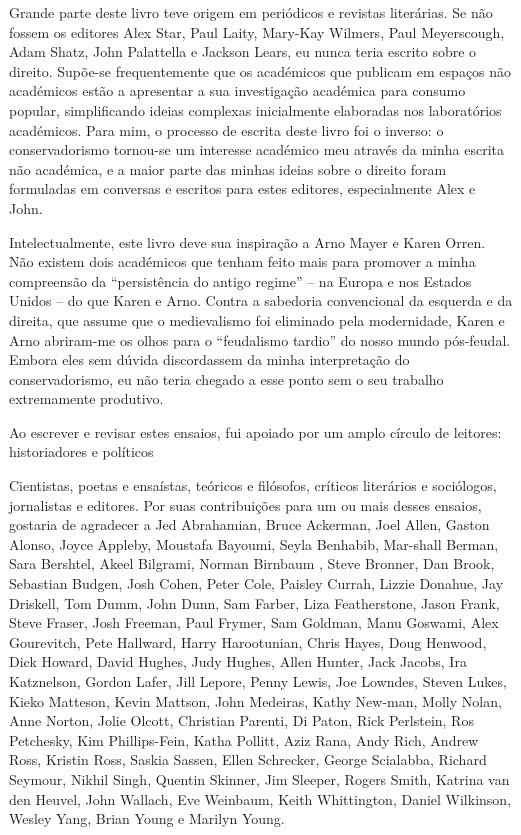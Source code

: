 Grande parte deste livro teve origem em periódicos e revistas literárias. Se não fossem os editores Alex Star, Paul Laity, Mary-Kay Wilmers, Paul Meyerscough, Adam Shatz, John Palattella e Jackson Lears, eu nunca teria escrito sobre o direito. Supõe-se frequentemente que os académicos que publicam em espaços não académicos estão a apresentar a sua investigação académica para consumo popular, simplificando ideias complexas inicialmente elaboradas nos laboratórios académicos. Para mim, o processo de escrita deste livro foi o inverso: o conservadorismo tornou-se um interesse académico meu através da minha escrita não académica, e a maior parte das minhas ideias sobre o direito foram formuladas em conversas e escritos para estes editores, especialmente Alex e John.
 \par 
Intelectualmente, este livro deve sua inspiração a Arno Mayer e Karen Orren. Não existem dois académicos que tenham feito mais para promover a minha compreensão da “persistência do antigo regime” – na Europa e nos Estados Unidos – do que Karen e Arno. Contra a sabedoria convencional da esquerda e da direita, que assume que o medievalismo foi eliminado pela modernidade, Karen e Arno abriram-me os olhos para o “feudalismo tardio” do nosso mundo pós-feudal. Embora eles sem dúvida discordassem da minha interpretação do conservadorismo, eu não teria chegado a esse ponto sem o seu trabalho extremamente produtivo.
 \par 
Ao escrever e revisar estes ensaios, fui apoiado por um amplo círculo de leitores: historiadores e políticos
 \par 
Cientistas, poetas e ensaístas, teóricos e filósofos, críticos literários e sociólogos, jornalistas e editores. Por suas contribuições para um ou mais desses ensaios, gostaria de agradecer a Jed Abrahamian, Bruce Ackerman, Joel Allen, Gaston Alonso, Joyce Appleby, Moustafa Bayoumi, Seyla Benhabib, Mar-shall Berman, Sara Bershtel, Akeel Bilgrami, Norman Birnbaum , Steve Bronner, Dan Brook, Sebastian Budgen, Josh Cohen, Peter Cole, Paisley Currah, Lizzie Donahue, Jay Driskell, Tom Dumm, John Dunn, Sam Farber, Liza Featherstone, Jason Frank, Steve Fraser, Josh Freeman, Paul Frymer, Sam Goldman, Manu Goswami, Alex Gourevitch, Pete Hallward, Harry Harootunian, Chris Hayes, Doug Henwood, Dick Howard, David Hughes, Judy Hughes, Allen Hunter, Jack Jacobs, Ira Katznelson, Gordon Lafer, Jill Lepore, Penny Lewis, Joe Lowndes, Steven Lukes, Kieko Matteson, Kevin Mattson, John Medeiras, Kathy New-man, Molly Nolan, Anne Norton, Jolie Olcott, Christian Parenti, Di Paton, Rick Perlstein, Ros Petchesky, Kim Phillips-Fein, Katha Pollitt, Aziz Rana, Andy Rich, Andrew Ross, Kristin Ross, Saskia Sassen, Ellen Schrecker, George Scialabba, Richard Seymour, Nikhil Singh, Quentin Skinner, Jim Sleeper, Rogers Smith, Katrina van den Heuvel, John Wallach, Eve Weinbaum, Keith Whittington, Daniel Wilkinson, Wesley Yang, Brian Young e Marilyn Young.
